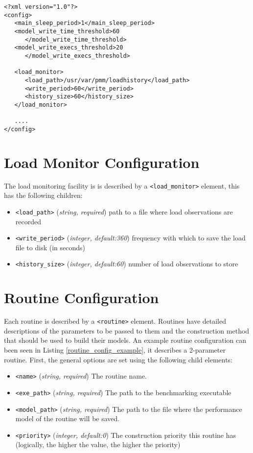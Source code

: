 \documentclass[a4paper,12pt]{report}
\begin{document}
    \begin{lstlisting}[style=xmlconfig,caption=Basic Configuration,float=h,label=basic_config_example]
<?xml version="1.0"?>
<config>
   <main_sleep_period>1</main_sleep_period>
   <model_write_time_threshold>60
      </model_write_time_threshold>
   <model_write_execs_threshold>20
      </model_write_execs_threshold>

   <load_monitor>
      <load_path>/usr/var/pmm/loadhistory</load_path>
      <write_period>60</write_period>
      <history_size>60</history_size>
   </load_monitor>

   ....
</config>
    \end{lstlisting}

    \section{Load Monitor Configuration}

    The load monitoring facility is is described by a \verb+<load_monitor>+
    element, this has the following children:

    \begin{itemize}
        \item \verb+<load_path>+ (\emph{string, required}) path to a file where
            load observations are recorded
        \item \verb+<write_period>+ (\emph{integer, default:360}) frequency
            with which to save the load file to disk (in seconds)
        \item \verb+<history_size>+ (\emph{integer, default:60}) number of load
            observations to store \end{itemize}


    \section{Routine Configuration}

    \noindent Each routine is described by a \verb+<routine>+ element.
    Routines have detailed descriptions of the parameters to be passed to them
    and the construction method that should be used to build their models. An
    example routine configuration can been seen in Listing
    \ref{routine_config_example}, it describes a 2-parameter routine. First,
    the general options are set using the following child elements:
    \begin{itemize}
        \item \verb+<name>+ (\emph{string, required}) The routine name.
        \item \verb+<exe_path>+ (\emph{string, required}) The path to the
            benchmarking executable
        \item \verb+<model_path>+ (\emph{string, required}) The path to the
            file where the performance model of the routine will be saved.
        \item \verb+<priority>+ (\emph{integer, default:0}) The construction
            priority this routine has (logically, the higher the value, the
            higher the priority)
    \end{itemize}
\end{document}
